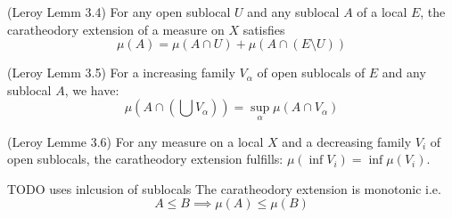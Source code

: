 \begin{lemma}[Property 2]
(Leroy Lemm 3.4)
    \label{lem:property_2}
    For any open sublocal $U$ and any sublocal $A$ of a local $E$, the caratheodory extension of a measure on $X$ satisfies \[\mu(A) = \mu(A \cap U) + \mu(A \cap(E\setminus U))\]
\end{lemma}

\begin{lemma}[Property 3]
(Leroy Lemm 3.5)
    \label{lem:property_3}
    For a increasing family $V_{\alpha}$ of open sublocals of $E$ and any sublocal $A$, we have:
    \[\mu(A \cap(\bigcup V_{\alpha})) = \sup_\alpha \mu(A\cap V_\alpha)\]
\end{lemma}


\begin{lemma}
(Leroy Lemme 3.6)
    \label{lem:commutes_with_inf_opens}
    For any measure on a local $X$ and a decreasing family $V_i$ of open sublocals, the caratheodory extension fulfills: $\mu (\inf V_i) = \inf \mu(V_i)$.
\end{lemma}

\begin{lemma}
    \label{lem:monotonic}
     TODO uses inlcusion of sublocals
    The caratheodory extension is monotonic i.e. \[A \le B \implies \mu (A) \le \mu (B)\]
\end{lemma}

